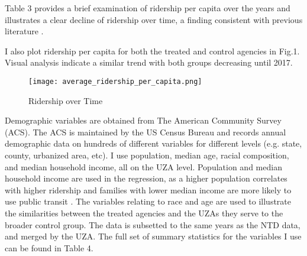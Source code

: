 \documentclass [12pt]{report}
\begin{document}
Table 3 provides a brief examination of ridership per capita over the years and illustrates a clear decline of ridership over time, a finding consistent with previous literature \parencite{erhardt22}.
\begin{table}[H] 
\tiny
\centering \renewcommand*{\arraystretch}{1.1}\caption{Ridership per capita by year}
\end{table}
I also plot ridership per capita for both the treated and control agencies in Fig.1. Visual analysis indicate a similar trend with both groups decreasing until 2017. 
\begin{figure}[H]
    \centering
    \texttt{[image: average\_ridership\_per\_capita.png]} %
    \caption{Ridership over Time}
\end{figure}
\indent Demographic variables are obtained from The American Community Survey (ACS). The ACS is maintained by the US Census Bureau and records annual demographic data on hundreds of different variables for different levels (e.g. state, county, urbanized area, etc). I use population, median age, racial composition, and median household income, all on the UZA level. Population and median household income are used in the regression, as a higher population correlates with higher ridership and families with lower median income are more likely to use public transit \parencite{wang}. The variables relating to race and age are used to illustrate the similarities between the treated agencies and the UZAs they serve to the broader control group. The data is subsetted to the same years as the NTD data, and merged by the UZA. The full set of summary statistics for the variables I use can be found in Table 4.\\
\end{document}
